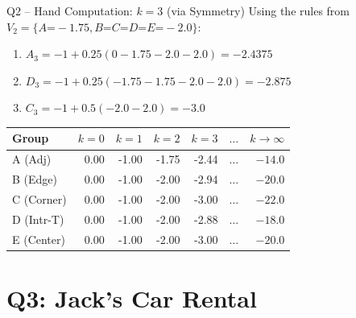 \documentclass[aspectratio=169,12pt]{beamer}
\begin{document}
\begin{frame}{Q2 -- Hand Computation: $k=3$ (via Symmetry)}
  Using the rules from $V_2 = \{A\mathord{=}-1.75, B\mathord{=}C\mathord{=}D\mathord{=}E\mathord{=}-2.0\}$:
  \begin{enumerate}
    \item $A_{3} = -1 + 0.25(0 - 1.75 - 2.0 - 2.0) = \mathbf{-2.4375}$
    \item $D_{3} = -1 + 0.25(-1.75 - 1.75 - 2.0 - 2.0) = \mathbf{-2.875}$
    \item $C_{3} = -1 + 0.5(-2.0 - 2.0) = \mathbf{-3.0}$
  \end{enumerate}

  \begin{table}
    \scriptsize
    \begin{tabular}{lrrrrrr}
      \toprule
      Group & $k=0$ & $k=1$ & $k=2$ & $k=3$ & $\dots$ & $k\to\infty$ \\
      \midrule
      A (Adj)    & 0.00 & -1.00 & -1.75 & -2.44 & $\dots$ & $\mathbf{-14.0}$ \\
      B (Edge)   & 0.00 & -1.00 & -2.00 & -2.94 & $\dots$ & $\mathbf{-20.0}$ \\
      C (Corner) & 0.00 & -1.00 & -2.00 & -3.00 & $\dots$ & $\mathbf{-22.0}$ \\
      D (Intr-T) & 0.00 & -1.00 & -2.00 & -2.88 & $\dots$ & $\mathbf{-18.0}$ \\
      E (Center) & 0.00 & -1.00 & -2.00 & -3.00 & $\dots$ & $\mathbf{-20.0}$ \\
      \bottomrule
    \end{tabular}
  \end{table}
\end{frame}

\section{Q3: Jack's Car Rental}
\end{document}
